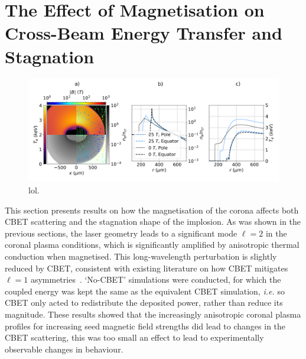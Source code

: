 \section{The Effect of Magnetisation on Cross-Beam Energy Transfer and Stagnation}%
\label{sec:Res2_mag_on_CBET}


\begin{figure}[t!]
    \includegraphics[width=\linewidth]{Results2/Images/ne_te_Bstream_comp_alt050.png}
    \centering
    \caption{lol.}%
    \label{fig:Res2_ne_te_Bstream_comp_alt050}
\end{figure}

This section presents results on how the magnetisation of the corona affects both \ac{CBET} scattering and the stagnation shape of the implosion.
As was shown in the previous sections, the laser geometry leads to a significant mode $\ell=2$ in the coronal plasma conditions, which is significantly amplified by anisotropic thermal conduction when magnetised.
This long-wavelength perturbation is slightly reduced by \ac{CBET}, consistent with existing literature on how \ac{CBET} mitigates $\ell=1$ asymmetries~\cite{colaitis_inverse_2021}.
`No-\ac{CBET}' simulations were conducted, for which the coupled energy was kept the same as the equivalent \ac{CBET} simulation, \textit{i.e.} so \ac{CBET} only acted to redistribute the deposited power, rather than reduce its magnitude.
These results showed that the increasingly anisotropic coronal plasma profiles for increasing seed magnetic field strengths did lead to changes in the \ac{CBET} scattering, this was too small an effect to lead to experimentally observable changes in behaviour.

